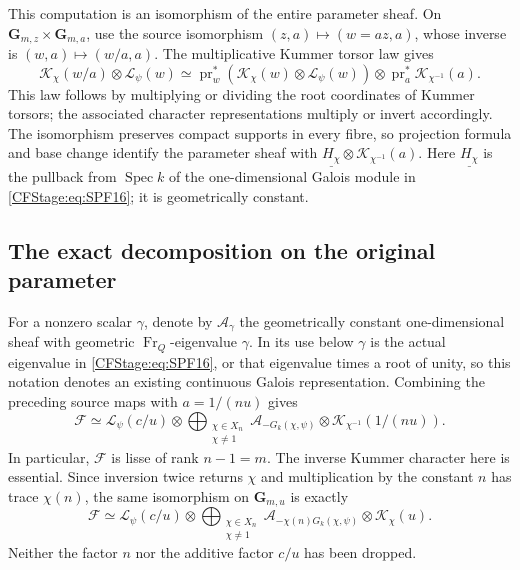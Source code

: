 This computation is an isomorphism of the entire parameter
sheaf. On
\(\mathbf G_{m,z}\times\mathbf G_{m,a}\), use the source
isomorphism
\((z,a)\mapsto(w=az,a)\), whose inverse is
\((w,a)\mapsto(w/a,a)\).
The multiplicative Kummer torsor law gives
\[
 \mathcal K_\chi(w/a)\otimes\mathcal L_\psi(w)
  \simeq
 \operatorname{pr}_w^*
       (\mathcal K_\chi(w)\otimes\mathcal L_\psi(w))
      \otimes\operatorname{pr}_a^*\mathcal K_{\chi^{-1}}(a).
 \tag{SPF.17}\label{CFStage:eq:SPF17}
\]
This law follows by multiplying or dividing the root coordinates
of Kummer torsors; the associated character representations
multiply or invert accordingly. The isomorphism preserves
compact supports in every fibre, so projection formula and
base change identify the parameter sheaf with
\(\underline{H_\chi}\otimes\mathcal K_{\chi^{-1}}(a)\).
Here \(\underline{H_\chi}\) is the pullback from
\(\operatorname{Spec}k\) of the one-dimensional Galois module
in \eqref{CFStage:eq:SPF16}; it is geometrically constant.

\subsection{The exact decomposition on the original parameter}

For a nonzero scalar \(\gamma\), denote by \(\mathcal A_\gamma\)
the geometrically constant one-dimensional sheaf with geometric
\(\operatorname{Fr}_Q\)-eigenvalue \(\gamma\). In its use below
\(\gamma\) is the actual eigenvalue in \eqref{CFStage:eq:SPF16}, or
that eigenvalue times a root of unity, so this notation
denotes an existing continuous Galois representation.
Combining the preceding source maps with
\(a=1/(nu)\) gives
\[
 \boxed{\displaystyle
 \mathcal F\simeq
 \mathcal L_\psi(c/u)\otimes
 \bigoplus_{\substack{\chi\in X_n\\\chi\ne1}}
  \mathcal A_{-G_k(\chi,\psi)}
           \otimes\mathcal K_{\chi^{-1}}(1/(nu)).}
 \tag{SPF.18}\label{CFStage:eq:SPF18}
\]
In particular, \(\mathcal F\) is lisse of rank \(n-1=m\).
The inverse Kummer character here is essential.
Since inversion twice returns \(\chi\) and multiplication by
the constant \(n\) has trace \(\chi(n)\), the same isomorphism
on \(\mathbf G_{m,u}\) is exactly
\[
 \boxed{\displaystyle
 \mathcal F\simeq
 \mathcal L_\psi(c/u)\otimes
 \bigoplus_{\substack{\chi\in X_n\\\chi\ne1}}
  \mathcal A_{-\chi(n)G_k(\chi,\psi)}
                 \otimes\mathcal K_\chi(u).}
 \tag{SPF.19}\label{CFStage:eq:SPF19}
\]
Neither the factor \(n\) nor the additive factor \(c/u\) has
been dropped.

